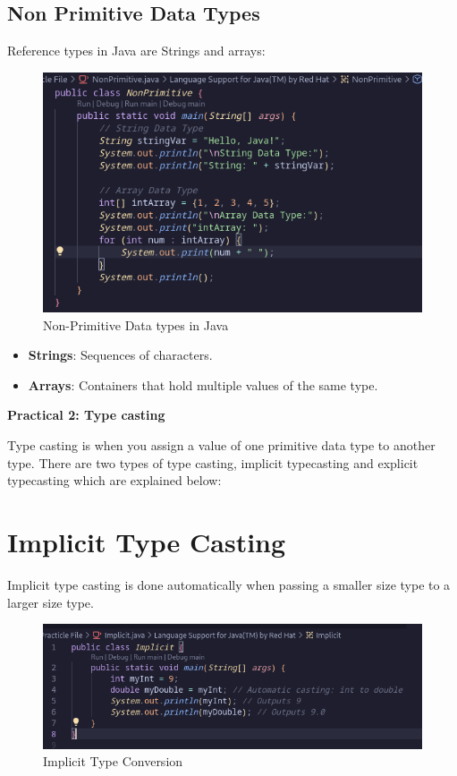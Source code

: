 \documentclass[a4paper,12pt]{article}
\newcommand{\practicaltitle}[1]{
    \newpage
    \begin{center}
        \Large\textbf{#1} \\
        \normalsize\vspace{0.5cm}
    \end{center}
}
\begin{document}
\subsection{Non Primitive Data Types}
Reference types in Java are Strings and arrays:
\begin{figure}[H]
    \centering
    \includegraphics[width=0.9\linewidth]{images/non_primitve.png}
    \caption{Non-Primitive Data types in Java}
    \label{fig:sample_image}
\end{figure}

\begin{itemize}[leftmargin=2cm]
    \item \textbf{Strings}: Sequences of characters.
    \item \textbf{Arrays}: Containers that hold multiple values of the same type.
\end{itemize}

\setcounter{section}{0}

\practicaltitle{Practical 2: Type casting}
Type casting is when you assign a value of one primitive data type to another type. There are two types of type casting, implicit typecasting and explicit typecasting which are explained below: 

\section{Implicit Type Casting}
Implicit type casting is done automatically when passing a smaller size type to a larger size type.
\begin{center}
\end{center}
\begin{figure}[H]
    \centering
    \includegraphics[width=0.9\linewidth]{images/implicit.png}
    \caption{Implicit Type Conversion}
    \label{fig:sample_image}
\end{figure}
\end{document}
